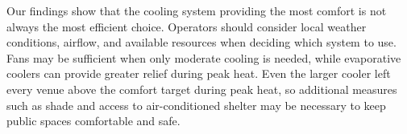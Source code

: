 Our findings show that the cooling system providing the most comfort is not always the most efficient choice. Operators should consider local weather conditions, airflow, and available resources when deciding which system to use. Fans may be sufficient when only moderate cooling is needed, while evaporative coolers can provide greater relief during peak heat. Even the larger cooler left every venue above the comfort target during peak heat, so additional measures such as shade and access to air-conditioned shelter may be necessary to keep public spaces comfortable and safe.
